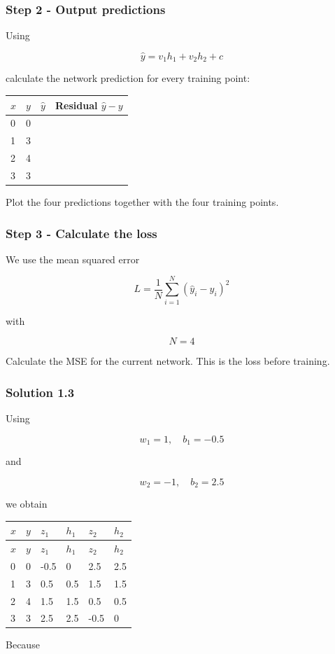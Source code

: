 \documentclass[10pt]{article}
\begin{document}
\subsubsection*{Step 2 - Output predictions}
Using

\[
\hat y=v_1h_1+v_2h_2+c
\]

calculate the network prediction for every training point:


\begin{center}
\begingroup
\small
\setlength{\tabcolsep}{4pt}
\begin{tabular}{l|l|l|l}
$x$ & $y$ & $\hat y$ & Residual $\hat y-y$ \\ \hline
\rule{0pt}{2.4ex}0 & 0 & $\phantom{0}$ & $\phantom{0}$ \\[3pt]
\rule{0pt}{2.4ex}1 & 3 & $\phantom{0}$ & $\phantom{0}$ \\[3pt]
\rule{0pt}{2.4ex}2 & 4 & $\phantom{0}$ & $\phantom{0}$ \\[3pt]
\rule{0pt}{2.4ex}3 & 3 & $\phantom{0}$ & $\phantom{0}$ \\[3pt]
\end{tabular}
\endgroup
\end{center}


Plot the four predictions together with the four training points.

\subsubsection*{Step 3 - Calculate the loss}
We use the mean squared error

\[
L=\frac{1}{N}\sum_{i=1}^{N}(\hat y_i-y_i)^2
\]

with

\[
N=4
\]

Calculate the MSE for the current network. This is the loss before training.

\begingroup\color{red}

\subsubsection*{Solution 1.3}
Using

\[
w_1=1,\quad b_1=-0.5
\]

and

\[
w_2=-1,\quad b_2=2.5
\]

we obtain

\begingroup
\small
\setlength{\tabcolsep}{4pt}
\begin{longtable}{l|l|l|l|l|l}
$x$ & $y$ & $z_1$ & $h_1$ & $z_2$ & $h_2$ \\[1.5pt]
\hline
\endfirsthead
$x$ & $y$ & $z_1$ & $h_1$ & $z_2$ & $h_2$ \\[1.5pt]
\hline
\endhead
0 & 0 & -0.5 & 0 & 2.5 & 2.5 \\[1.5pt]
1 & 3 & 0.5 & 0.5 & 1.5 & 1.5 \\[1.5pt]
2 & 4 & 1.5 & 1.5 & 0.5 & 0.5 \\[1.5pt]
3 & 3 & 2.5 & 2.5 & -0.5 & 0 \\[1.5pt]
\end{longtable}
\endgroup
Because
\end{document}
